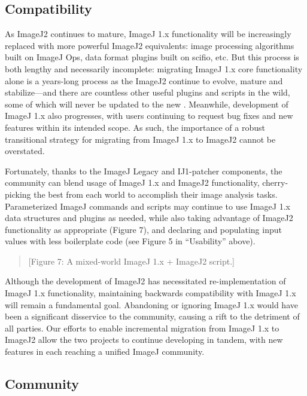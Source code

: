 \documentclass{bmcart}
\begin{document}
\subsection*{Compatibility}
As ImageJ2 continues to mature, ImageJ 1.x functionality will be increasingly
replaced with more powerful ImageJ2 equivalents: image processing algorithms
built on ImageJ Ops, data format plugins built on \acrshort{scifio}, etc. But
this process is both lengthy and necessarily incomplete: migrating ImageJ 1.x
core functionality alone is a years-long process as the ImageJ2
 continue to evolve, mature and stabilize---and there are
countless other useful plugins and scripts in the wild, some of which will
never be updated to the new . Meanwhile, development of ImageJ
1.x also progresses, with users continuing to request bug fixes and new
features within its intended scope. As such, the importance of a robust
transitional strategy for migrating from ImageJ 1.x to ImageJ2 cannot be
overstated.

Fortunately, thanks to the ImageJ Legacy and IJ1-patcher components, the
community can blend usage of ImageJ 1.x and ImageJ2 functionality,
cherry-picking the best from each world to accomplish their image analysis
tasks. Parameterized ImageJ commands and scripts may continue to use ImageJ 1.x
data structures and plugins as needed, while also taking advantage of ImageJ2
functionality as appropriate (Figure 7), and declaring and populating input
values with less boilerplate code (see Figure 5 in ``Usability'' above).

\begin{quote}
[Figure 7: A mixed-world ImageJ 1.x + ImageJ2 script.]
\end{quote}

Although the development of ImageJ2 has necessitated re-implementation of
ImageJ 1.x functionality, maintaining backwards compatibility with ImageJ 1.x
will remain a fundamental goal. Abandoning or ignoring ImageJ 1.x would have
been a significant disservice to the community, causing a rift to the detriment
of all parties. Our efforts to enable incremental migration from ImageJ 1.x to
ImageJ2 allow the two projects to continue developing in tandem, with new
features in each reaching a unified ImageJ community.

\subsection*{Community}
\end{document}
